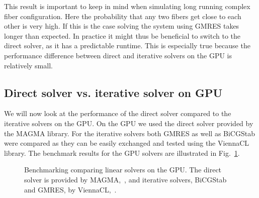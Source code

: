 This result is important to keep in mind when simulating long running complex fiber configuration. Here the probability that any two fibers get close to each other is very high. If this is the case solving the system using GMRES takes longer than expected. In practice it might thus be beneficial to switch to the direct solver, as it has a predictable runtime. This is especially true because the performance difference between direct and iterative solvers on the GPU is relatively small.

\subsection{Direct solver vs. iterative solver on GPU}

We will now look at the performance of the direct solver compared to the iterative solvers on the GPU. On the GPU we used the direct solver provided by the MAGMA library. For the iterative solvers both GMRES as well as BiCGStab were compared as they can be easily exchanged and tested using the ViennaCL library. The benchmark results for the GPU solvers are illustrated in Fig.~\ref{fig:bench_cuda_solvers}.

\begin{figure}[!htbp]
  \centering
  \caption[Benchmark linear solvers on GPU.]{Benchmarking comparing linear solvers on the GPU. The direct solver is provided by MAGMA,~\cite{MagmaDocumentation}, and iterative solvers, BiCGStab and GMRES, by ViennaCL,~\cite{ViennaCLRupp2010}.}
  \label{fig:bench_cuda_solvers}
\end{figure}

